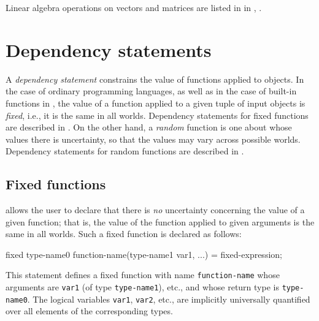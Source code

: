 \documentclass[12pt]{article}
\renewcommand{\optional}[1]{} %
\begin{document}
\optional{
\subsection{Size of an array}\label{-section}
There are two special functions to obtain the size of an array, \texttt{length(\mycdot)} and \texttt{size(\mycdot)}.
\texttt{length(\mycdot)} returns the length of one dimensional array, while \texttt{size(\mycdot)} returns the lengths of all dimensions
of a multidimensional array.  In the above example, \texttt{length(table)} equals 3, and \texttt{size(table)} equals \texttt{[2, 3]}.
}

Linear algebra operations on vectors and matrices are listed in
in , .


\section{Dependency statements}\label{dependency-section}

A {\em dependency statement} constrains the value of functions applied to objects. In the case of ordinary programming languages,
as well as in the case of built-in functions in \bl, the value of a function applied to a given tuple of input objects is {\em fixed},
i.e., it is the same in all worlds. Dependency statements for fixed functions are described in . On the other hand, a {\em random} function
is one about whose values there is uncertainty, so that the values may vary across possible worlds. Dependency statements for random functions are described in .

\subsection{Fixed functions}\label{fixed-section}

\bl allows the user to declare that there is {\em no} uncertainty concerning the value of a given function; that is, the
value of the function applied to given arguments is the same in all worlds. Such a fixed function is declared as follows:
\begin{blogcode}
fixed type-name0 function-name(type-name1 var1, ...) = fixed-expression;
\end{blogcode}
This statement defines a fixed function with name \texttt{function-name} whose arguments are {\tt var1} (of type {\tt type-name1}), etc.,
and whose return type is \texttt{type-name0}. The logical variables {\tt var1}, {\tt var2}, etc., are implicitly universally quantified over
all elements of the corresponding types.
\end{document}
